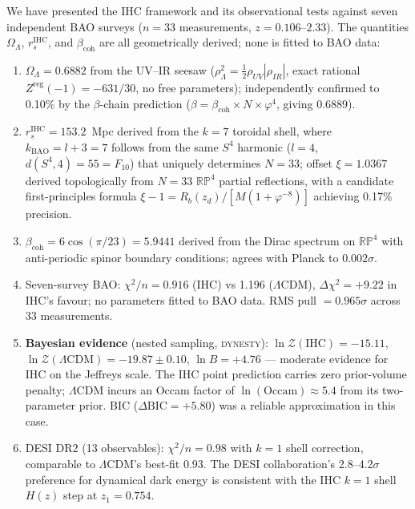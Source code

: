 \documentclass[12pt,a4paper]{article}
\begin{document}
We have presented the IHC framework and its observational tests against seven independent
BAO surveys ($n = 33$ measurements, $z = 0.106$--$2.33$). The quantities
$\Omega_\Lambda$, $r_s^\mathrm{IHC}$, and $\beta_\mathrm{coh}$ are all geometrically
derived; none is fitted to BAO data:
\begin{enumerate}
  \item $\Omega_\Lambda = 0.6882$ from the UV--IR seesaw
        ($\rho_\Lambda^2 = \tfrac{1}{2}\rho_{UV}|\rho_{IR}|$, exact rational
        $Z^\mathrm{reg}(-1) = -631/30$, no free parameters); independently
        confirmed to 0.10\% by the $\beta$-chain prediction
        ($\beta = \beta_\mathrm{coh} \times N \times \varphi^4$, giving 0.6889).
  \item $r_s^\mathrm{IHC} = 153.2$~Mpc derived from the $k = 7$ toroidal shell,
        where $k_\mathrm{BAO} = l+3 = 7$ follows from the same $S^4$ harmonic
        ($l=4$, $d(S^4,4)=55=F_{10}$) that uniquely determines $N = 33$;
        offset $\xi = 1.0367$ derived topologically from $N=33$ $\mathbb{RP}^4$
        partial reflections, with a candidate first-principles formula
        $\xi-1 = R_b(z_d)/[M(1+\varphi^{-8})]$ achieving 0.17\% precision.
  \item $\beta_\mathrm{coh} = 6\cos(\pi/23) = 5.9441$ derived from the Dirac
        spectrum on $\mathbb{RP}^4$ with anti-periodic spinor boundary conditions;
        agrees with Planck to $0.002\sigma$.
  \item Seven-survey BAO: $\chi^2/n = 0.916$ (IHC) vs 1.196 ($\Lambda$CDM),
        $\Delta\chi^2 = +9.22$ in IHC's favour; no parameters fitted to BAO data.
        RMS pull $= 0.965\sigma$ across 33 measurements.
  \item \textbf{Bayesian evidence} (nested sampling, \textsc{dynesty}):
        $\ln\mathcal{Z}(\mathrm{IHC}) = -15.11$,
        $\ln\mathcal{Z}(\Lambda\mathrm{CDM}) = -19.87 \pm 0.10$,
        $\ln B = +4.76$ --- moderate evidence for IHC on the Jeffreys scale.
        The IHC point prediction carries zero prior-volume penalty; $\Lambda$CDM
        incurs an Occam factor of $\ln(\mathrm{Occam}) \approx 5.4$ from its
        two-parameter prior.  BIC ($\Delta\mathrm{BIC} = +5.80$) was a reliable
        approximation in this case.
  \item DESI DR2 (13 observables): $\chi^2/n = 0.98$ with $k=1$ shell correction,
        comparable to $\Lambda$CDM's best-fit 0.93. The DESI collaboration's
        2.8--4.2$\sigma$ preference for dynamical dark energy is consistent with
        the IHC $k=1$ shell $H(z)$ step at $z_1 = 0.754$.

\end{enumerate}
\end{document}
